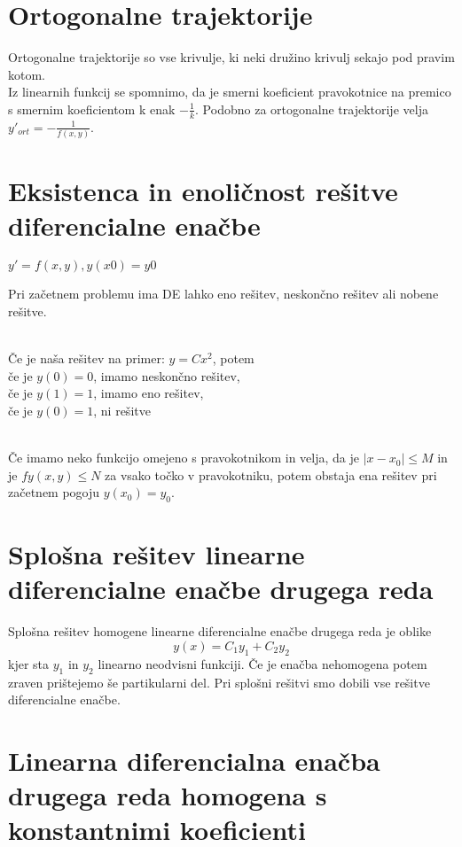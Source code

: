 \documentclass[12pt]{report}
\begin{document}
\section*{Ortogonalne trajektorije}

Ortogonalne trajektorije so vse krivulje, ki neki družino krivulj sekajo pod pravim kotom.\\ Iz linearnih funkcij se spomnimo, da je smerni koeficient pravokotnice na premico s smernim koeficientom k enak $-\frac{1}{k}$. Podobno za ortogonalne trajektorije velja $y'_{ort}= -\frac{1}{f(x,y)}$.


\section*{Eksistenca in enoličnost rešitve diferencialne enačbe}

$y'=f(x,y), y(x0)=y0$

Pri začetnem problemu ima DE lahko eno rešitev, neskončno rešitev ali nobene rešitve.\\\

Če je naša rešitev na primer: $y = Cx^2$, potem\\
če je $y(0) = 0$,  imamo neskončno rešitev,\\
če je $y(1) = 1 $,  imamo eno rešitev,\\
če je $y(0) = 1$,  ni rešitve\\\

Če imamo neko funkcijo omejeno s pravokotnikom in velja, da je $|x-x_0| \leq M$ in je $fy(x,y) \leq N$ za vsako točko v pravokotniku, potem obstaja ena rešitev pri začetnem pogoju $y(x_0) = y_0$.


\section*{Splošna rešitev linearne diferencialne enačbe drugega reda}

Splošna rešitev homogene linearne diferencialne enačbe drugega reda je oblike
\[y(x) = C_1y_1+C_2y_2\] kjer sta $y_1$ in $y_2$ linearno neodvisni funkciji. Če je enačba nehomogena potem zraven prištejemo še partikularni del. Pri splošni rešitvi smo dobili vse rešitve diferencialne enačbe.


\section*{Linearna diferencialna enačba drugega reda homogena s konstantnimi koeficienti}
\end{document}

